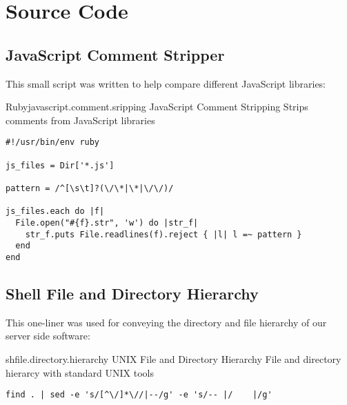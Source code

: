 \chapter{Source Code}

\section{JavaScript Comment Stripper}
\label{section:source.code.javascript.comment.stripper}

This small script was written to help
compare different JavaScript libraries:


\begin{scode}{Ruby}{javascript.comment.sripping}{%
  JavaScript Comment Stripping}{%
  Strips comments from JavaScript libraries}
\begin{lstlisting}
#!/usr/bin/env ruby

js_files = Dir['*.js']

pattern = /^[\s\t]?(\/\*|\*|\/\/)/

js_files.each do |f|
  File.open("#{f}.str", 'w') do |str_f| 
    str_f.puts File.readlines(f).reject { |l| l =~ pattern }
  end
end
\end{lstlisting}
\end{scode}

\section{Shell File and Directory Hierarchy}
\label{section:source.code.hierarchy}

This one-liner was used for conveying the directory and file hierarchy of our
server side software:

\begin{scode}{sh}{file.directory.hierarchy}{%
  UNIX File and Directory Hierarchy}{%
  File and directory hierarcy with standard UNIX tools}
\begin{lstlisting}
find . | sed -e 's/[^\/]*\//|--/g' -e 's/-- |/    |/g'
\end{lstlisting}
\end{scode}
